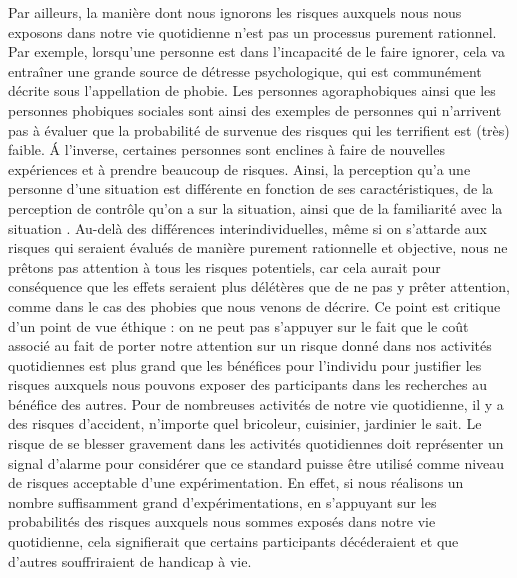 \documentclass[
  12pt,
]{book}
\begin{document}
Par ailleurs, la manière dont nous ignorons les risques auxquels nous nous exposons dans notre vie quotidienne n'est pas un processus purement rationnel. Par exemple, lorsqu'une personne est dans l'incapacité de le faire ignorer, cela va entraîner une grande source de détresse psychologique, qui est communément décrite sous l'appellation de phobie. Les personnes agoraphobiques ainsi que les personnes phobiques sociales sont ainsi des exemples de personnes qui n'arrivent pas à évaluer que la probabilité de survenue des risques qui les terrifient est (très) faible. Á l'inverse, certaines personnes sont enclines à faire de nouvelles expériences et à prendre beaucoup de risques. Ainsi, la perception qu'a une personne d'une situation est différente en fonction de ses caractéristiques, de la perception de contrôle qu'on a sur la situation, ainsi que de la familiarité avec la situation \citep[voir par exemple,][]{Weinstein1989}. Au-delà des différences interindividuelles, même si on s'attarde aux risques qui seraient évalués de manière purement rationnelle et objective, nous ne prêtons pas attention à tous les risques potentiels, car cela aurait pour conséquence que les effets seraient plus délétères que de ne pas y prêter attention, comme dans le cas des phobies que nous venons de décrire. Ce point est critique d'un point de vue éthique : on ne peut pas s'appuyer sur le fait que le coût associé au fait de porter notre attention sur un risque donné dans nos activités quotidiennes est plus grand que les bénéfices pour l'individu pour justifier les risques auxquels nous pouvons exposer des participants dans les recherches au bénéfice des autres. Pour de nombreuses activités de notre vie quotidienne, il y a des risques d'accident, n'importe quel bricoleur, cuisinier, jardinier le sait. Le risque de se blesser gravement dans les activités quotidiennes doit représenter un signal d'alarme pour considérer que ce standard puisse être utilisé comme niveau de risques acceptable d'une expérimentation. En effet, si nous réalisons un nombre suffisamment grand d'expérimentations, en s'appuyant sur les probabilités des risques auxquels nous sommes exposés dans notre vie quotidienne, cela signifierait que certains participants décéderaient et que d'autres souffriraient de handicap à vie.
\end{document}
